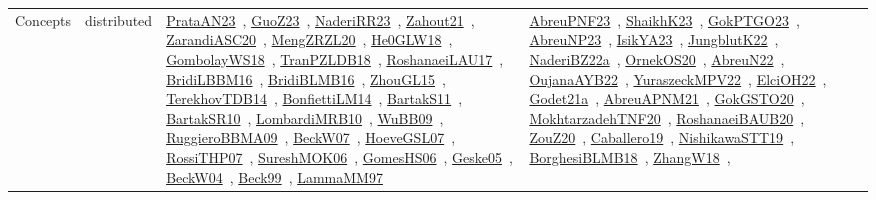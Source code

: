 {\begin{longtable}{lp{3cm}>{\raggedright\arraybackslash}p{6cm}>{\raggedright\arraybackslash}p{6cm}>{\raggedright\arraybackslash}p{8cm}}
Concepts & distributed & \href{../works/PrataAN23.pdf}{PrataAN23}~\cite{PrataAN23}, \href{../works/GuoZ23.pdf}{GuoZ23}~\cite{GuoZ23}, \href{../works/NaderiRR23.pdf}{NaderiRR23}~\cite{NaderiRR23}, \href{../works/Zahout21.pdf}{Zahout21}~\cite{Zahout21}, \href{../works/ZarandiASC20.pdf}{ZarandiASC20}~\cite{ZarandiASC20}, \href{../works/MengZRZL20.pdf}{MengZRZL20}~\cite{MengZRZL20}, \href{../works/He0GLW18.pdf}{He0GLW18}~\cite{He0GLW18}, \href{../works/GombolayWS18.pdf}{GombolayWS18}~\cite{GombolayWS18}, \href{../works/TranPZLDB18.pdf}{TranPZLDB18}~\cite{TranPZLDB18}, \href{../works/RoshanaeiLAU17.pdf}{RoshanaeiLAU17}~\cite{RoshanaeiLAU17}, \href{../works/BridiLBBM16.pdf}{BridiLBBM16}~\cite{BridiLBBM16}, \href{../works/BridiBLMB16.pdf}{BridiBLMB16}~\cite{BridiBLMB16}, \href{../works/ZhouGL15.pdf}{ZhouGL15}~\cite{ZhouGL15}, \href{../works/TerekhovTDB14.pdf}{TerekhovTDB14}~\cite{TerekhovTDB14}, \href{../works/BonfiettiLM14.pdf}{BonfiettiLM14}~\cite{BonfiettiLM14}, \href{../works/BartakS11.pdf}{BartakS11}~\cite{BartakS11}, \href{../works/BartakSR10.pdf}{BartakSR10}~\cite{BartakSR10}, \href{../works/LombardiMRB10.pdf}{LombardiMRB10}~\cite{LombardiMRB10}, \href{../works/WuBB09.pdf}{WuBB09}~\cite{WuBB09}, \href{../works/RuggieroBBMA09.pdf}{RuggieroBBMA09}~\cite{RuggieroBBMA09}, \href{../works/BeckW07.pdf}{BeckW07}~\cite{BeckW07}, \href{../works/HoeveGSL07.pdf}{HoeveGSL07}~\cite{HoeveGSL07}, \href{../works/RossiTHP07.pdf}{RossiTHP07}~\cite{RossiTHP07}, \href{../works/SureshMOK06.pdf}{SureshMOK06}~\cite{SureshMOK06}, \href{../works/GomesHS06.pdf}{GomesHS06}~\cite{GomesHS06}, \href{../works/Geske05.pdf}{Geske05}~\cite{Geske05}, \href{../works/BeckW04.pdf}{BeckW04}~\cite{BeckW04}, \href{../works/Beck99.pdf}{Beck99}~\cite{Beck99}, \href{../works/LammaMM97.pdf}{LammaMM97}~\cite{LammaMM97} & \href{../works/AbreuPNF23.pdf}{AbreuPNF23}~\cite{AbreuPNF23}, \href{../works/ShaikhK23.pdf}{ShaikhK23}~\cite{ShaikhK23}, \href{../works/GokPTGO23.pdf}{GokPTGO23}~\cite{GokPTGO23}, \href{../works/AbreuNP23.pdf}{AbreuNP23}~\cite{AbreuNP23}, \href{../works/IsikYA23.pdf}{IsikYA23}~\cite{IsikYA23}, \href{../works/JungblutK22.pdf}{JungblutK22}~\cite{JungblutK22}, \href{../works/NaderiBZ22a.pdf}{NaderiBZ22a}~\cite{NaderiBZ22a}, \href{../works/OrnekOS20.pdf}{OrnekOS20}~\cite{OrnekOS20}, \href{../works/AbreuN22.pdf}{AbreuN22}~\cite{AbreuN22}, \href{../works/OujanaAYB22.pdf}{OujanaAYB22}~\cite{OujanaAYB22}, \href{../works/YuraszeckMPV22.pdf}{YuraszeckMPV22}~\cite{YuraszeckMPV22}, \href{../works/ElciOH22.pdf}{ElciOH22}~\cite{ElciOH22}, \href{../works/Godet21a.pdf}{Godet21a}~\cite{Godet21a}, \href{../works/AbreuAPNM21.pdf}{AbreuAPNM21}~\cite{AbreuAPNM21}, \href{../works/GokGSTO20.pdf}{GokGSTO20}~\cite{GokGSTO20}, \href{../works/MokhtarzadehTNF20.pdf}{MokhtarzadehTNF20}~\cite{MokhtarzadehTNF20}, \href{../works/RoshanaeiBAUB20.pdf}{RoshanaeiBAUB20}~\cite{RoshanaeiBAUB20}, \href{../works/ZouZ20.pdf}{ZouZ20}~\cite{ZouZ20}, \href{../works/Caballero19.pdf}{Caballero19}~\cite{Caballero19}, \href{../works/NishikawaSTT19.pdf}{NishikawaSTT19}~\cite{NishikawaSTT19}, \href{../works/BorghesiBLMB18.pdf}{BorghesiBLMB18}~\cite{BorghesiBLMB18}, \href{../works/ZhangW18.pdf}{ZhangW18}~\cite{ZhangW18}, 
\end{longtable}}
